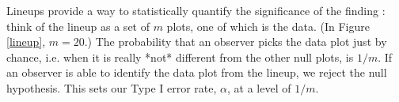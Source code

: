 


Lineups provide a way to statistically quantify the significance of the finding \citet{majumder:2011}: think of the lineup as a set of $m$ plots, one of which is the data. (In Figure \ref{lineup}, $m=20$.)  The probability that an observer picks the data plot just by chance, i.e. when it is really *not* different from the other null plots, is $1/m$.  If an observer is able to identify the data plot from the lineup, we reject the null hypothesis.  This sets our Type I error rate, $\alpha$, at a level of $1/m$.


